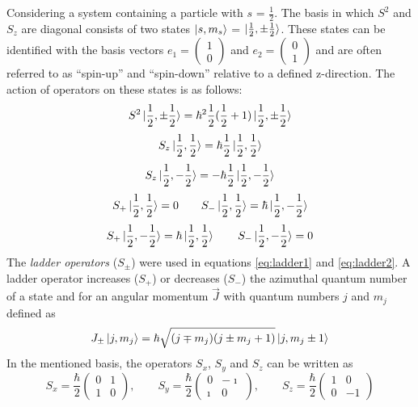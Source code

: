 Considering a system containing a particle with $s$ = $\frac{1}{2}$. The basis in which $S^{2}$ and $S_{z}$ are diagonal consists of two states $\ket{s,m_{s}}$ = $\ket{\frac{1}{2},\pm \frac{1}{2}}$. These states can be identified with the basis vectors $ e_{1} = \begin{pmatrix}1 \\ 0\end{pmatrix}$ and $ e_{2} = \begin{pmatrix}0 \\ 1\end{pmatrix}$ and are often referred to as ``spin-up'' and ``spin-down'' relative to a defined z-direction. The action of operators on these states is as follows:
%
\begin{equation}
 S^{2}\ket{\frac{1}{2},\pm \frac{1}{2}} = \hbar^{2}\frac{1}{2}(\frac{1}{2}+1) \ket{\frac{1}{2},\pm \frac{1}{2}}
\end{equation} 
%
\begin{equation}
 S_{z}\ket{\frac{1}{2}, \frac{1}{2}} = \hbar \frac{1}{2} \ket{\frac{1}{2}, \frac{1}{2}}
\end{equation} 
%
\begin{equation}
 S_{z}\ket{\frac{1}{2}, -\frac{1}{2}} = -\hbar \frac{1}{2} \ket{\frac{1}{2}, -\frac{1}{2}}
\end{equation} 
%
\begin{equation}
\label{eq:ladder1}
 S_{+}\ket{\frac{1}{2}, \frac{1}{2}} = 0 \hspace{2em} S_{-}\ket{\frac{1}{2}, \frac{1}{2}} = \hbar \ket{\frac{1}{2}, -\frac{1}{2}}
\end{equation} 
%
\begin{equation}
\label{eq:ladder2}
 S_{+}\ket{\frac{1}{2}, -\frac{1}{2}} = \hbar \ket{\frac{1}{2}, \frac{1}{2}} \hspace{2em} S_{-}\ket{\frac{1}{2}, -\frac{1}{2}} = 0
\end{equation} 
%
The \textit{ladder operators} ($S_{\pm}$) were used in equations \ref{eq:ladder1} and \ref{eq:ladder2}. A ladder operator increases ($S_{+}$) or decreases ($S_{-}$) the azimuthal quantum number of a state and for an angular momentum $\vec{J}$ with quantum numbers $j$ and $m_{j}$ defined as
%
\begin{equation}
 J_{\pm} \ket{j, m_{j}} = \hbar \sqrt{(j\mp m_{j}) (j \pm m_{j} +1) } \ket{j,m_{j}\pm 1}
\end{equation} 
%
In the mentioned basis, the operators $S_{x}$, $S_{y}$ and $S_{z}$ can be written as
\begin{equation}
 S_{x}=\frac{\hbar}{2} \begin{pmatrix}0 & 1 \\ 1 & 0\end{pmatrix}, \hspace{2em} S_{y}=\frac{\hbar}{2} \begin{pmatrix}0 & -\imath \\ \imath & 0\end{pmatrix}, \hspace{2em}%
 S_{z}=\frac{\hbar}{2} \begin{pmatrix}1 & 0 \\ 0 & -1\end{pmatrix}
\end{equation} 
